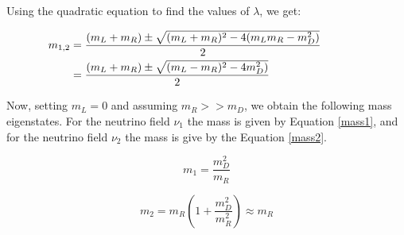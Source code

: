 Using the quadratic equation to find the values of $\lambda$, we get:

\begin{align}
  &\begin{aligned}
     \mathllap{m_{1,2}} &= \frac{(m_L + m_R) \pm \sqrt{(m_L + m_R)^2 - 4 (m_L m_R - m_D^2)}}{2} \\
     \mathllap{}        &= \frac{(m_L + m_R) \pm \sqrt{(m_L - m_R)^2 - 4 m_D^2)}}{2}
  &\end{aligned}
\end{align}

Now, setting $m_L= 0$ and assuming $m_R >> m_D$, we obtain the following mass eigenstates. For the 
neutrino field $\nu_1$ the mass is given by Equation \ref{mass1}, and for the neutrino field $\nu_2$ the mass is give by the Equation \ref{mass2}.

\begin{equation}
m_1 = \frac{m_D^2}{m_R}
\label{mass1}
\end{equation}

\begin{equation}
m_2 = m_R \left( 1 + \frac{m_D^2}{m_R^2} \right) \approx m_R
\label{mass2}
\end{equation}